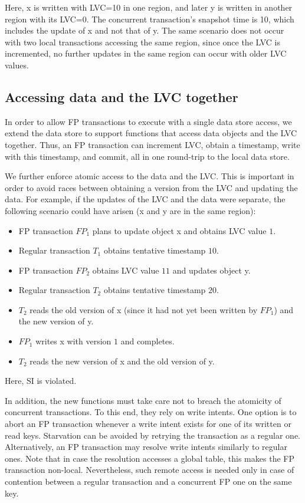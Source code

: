 Here, x is written with LVC=10 in one region, and later y is written in another region with its LVC=0. The
concurrent transaction's snapshot time is 10, which includes the update of x and
not that of y. The same scenario does not occur with two local transactions
accessing the same region, since once the LVC is incremented, no further
updates in the same region can occur with older LVC values.



\subsection{Accessing data and the LVC together} \label{ssec:lvc-access}

In order to allow FP transactions to execute with a single data store access,
we extend the data store to support functions that access data objects and the
LVC together. Thus, an FP transaction can increment LVC, obtain a timestamp, 
write with this timestamp, and commit, all in one round-trip to the local data store.

We further enforce atomic access to the data and the LVC. This is important in
order to avoid races between obtaining a version from the LVC and updating the
data. For example, if the updates of the LVC and the data were separate, the
following scenario could have arisen (x and y are in the same region):
\begin{itemize}
  \item FP transaction $FP_1$ plans to update object x and obtains LVC value $1$.
  \item Regular transaction $T_1$ obtains tentative timestamp $10$.
  \item FP transaction $FP_2$ obtains LVC value $11$ and updates object y.
  \item Regular transaction $T_2$ obtains tentative timestamp $20$.
  \item $T_2$ reads the old version of x  (since it had not yet been written by $FP_1$)
  and the new version of  y.
  \item $FP_1$ writes x with version $1$ and completes.
  \item $T_2$ reads the new version of x and the old version of  y.
\end{itemize}
Here, SI is violated.

In addition, the new functions must take care not to breach the  atomicity of concurrent transactions. 
To this end, they rely on  write intents. 
One option is to abort an FP transaction whenever a write intent exists for one of its written or read keys. 
Starvation can be avoided by retrying the transaction as a regular one.
Alternatively, an FP transaction may resolve write intents similarly to regular ones.
Note that in case the resolution accesses a global table, this makes the FP transaction non-local.
Nevertheless, such remote access is needed only in case of contention between a regular transaction 
and a concurrent FP one on the same key.

